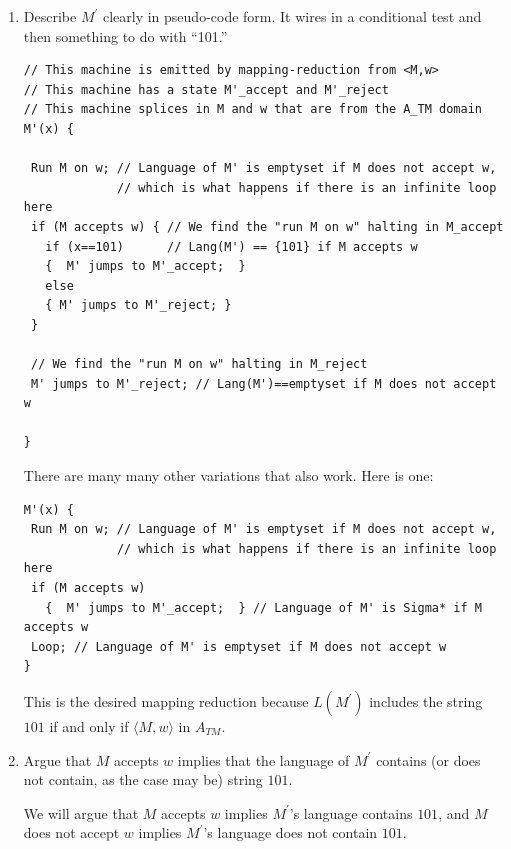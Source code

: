 \documentclass[10pt]{article}
\begin{document}
\begin{enumerate}
\item  Describe $M^{'}$ clearly in pseudo-code form. It wires in a conditional test
and then something to do with ``101.''

\begin{verbatim}
// This machine is emitted by mapping-reduction from <M,w>
// This machine has a state M'_accept and M'_reject
// This machine splices in M and w that are from the A_TM domain
M'(x) { 

 Run M on w; // Language of M' is emptyset if M does not accept w,
             // which is what happens if there is an infinite loop here
 if (M accepts w) { // We find the "run M on w" halting in M_accept
   if (x==101)      // Lang(M') == {101} if M accepts w
   {  M' jumps to M'_accept;  }
   else
   { M' jumps to M'_reject; } 
 }

 // We find the "run M on w" halting in M_reject
 M' jumps to M'_reject; // Lang(M')==emptyset if M does not accept w

}
\end{verbatim}

\begin{sf}
\noindent There are many many other variations that also work. Here is one: 
\end{sf}

\begin{verbatim}
M'(x) { 
 Run M on w; // Language of M' is emptyset if M does not accept w,
             // which is what happens if there is an infinite loop here
 if (M accepts w) 
   {  M' jumps to M'_accept;  } // Language of M' is Sigma* if M accepts w
 Loop; // Language of M' is emptyset if M does not accept w
}
\end{verbatim}

\begin{sf}
\noindent This is the desired mapping reduction because $L(M^{'})$ includes the string
$101$ if and  only if $\langle M,w\rangle$ in $A_{TM}$.
\end{sf}

\item Argue that $M$ accepts $w$ implies that the language
 of $M^{'}$
 contains (or does not contain, as the case may be) string $101$.

\begin{sf}
  We will argue that $M$ accepts $w$ implies
  $M^{'}$'s language contains $101$, and
  $M$ does not accept $w$ implies
  $M^{'}$'s language does not contain $101$.
  

\end{sf}
\end{enumerate}
\end{document}
